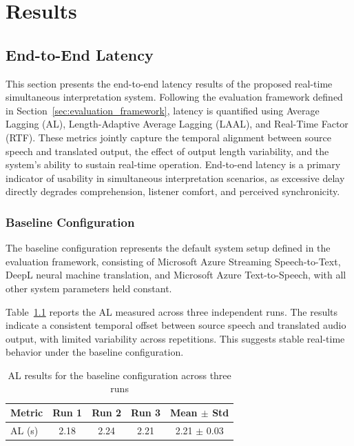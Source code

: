 
\chapter{Results}
\label{chapter:results}

\section{End-to-End Latency}
\label{sec:e2e_latency}

This section presents the end-to-end latency results of the proposed real-time simultaneous interpretation system. Following the evaluation framework defined in Section~\ref{sec:evaluation_framework}, latency is quantified using Average Lagging (AL), Length-Adaptive Average Lagging (LAAL), and Real-Time Factor (RTF). These metrics jointly capture the temporal alignment between source speech and translated output, the effect of output length variability, and the system’s ability to sustain real-time operation. End-to-end latency is a primary indicator of usability in simultaneous interpretation scenarios, as excessive delay directly degrades comprehension, listener comfort, and perceived synchronicity.

\subsection{Baseline Configuration}
\label{subsec:baseline_e2e}

The baseline configuration represents the default system setup defined in the evaluation framework, consisting of Microsoft Azure Streaming Speech-to-Text, DeepL neural machine translation, and Microsoft Azure Text-to-Speech, with all other system parameters held constant.

Table~\ref{tab:baseline_al} reports the AL measured across three independent runs. The results indicate a consistent temporal offset between source speech and translated audio output, with limited variability across repetitions. This suggests stable real-time behavior under the baseline configuration.

\begin{table}[!htbp]
\centering
\caption[Baseline Average Lagging results]{AL results for the baseline configuration across three runs}
\label{tab:baseline_al}
\begin{tabular}{lcccc}
\toprule
\textbf{Metric} & \textbf{Run 1} & \textbf{Run 2} & \textbf{Run 3} & \textbf{Mean $\pm$ Std} \\
\midrule
AL (s) & 2.18 & 2.24 & 2.21 & 2.21 $\pm$ 0.03 \\
\bottomrule
\end{tabular}
\end{table}

